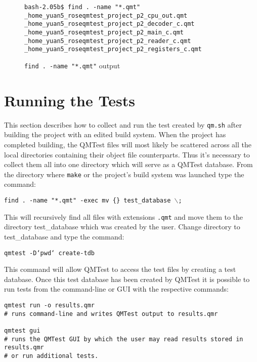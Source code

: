 \begin{figure}[!ht]
{\scriptsize
\begin{verbatim}
bash-2.05b$ find . -name "*.qmt" 
_home_yuan5_roseqmtest_project_p2_cpu_out.qmt
_home_yuan5_roseqmtest_project_p2_decoder_c.qmt
_home_yuan5_roseqmtest_project_p2_main_c.qmt
_home_yuan5_roseqmtest_project_p2_reader_c.qmt
_home_yuan5_roseqmtest_project_p2_registers_c.qmt
\end{verbatim}
}
\caption{{\tt find . -name "*.qmt"} output}
\end{figure}

\section{Running the Tests}

This section describes how to collect and run the test created by {\tt qm.sh}
after building the project with an edited build system. When the project has
completed building, the QMTest files will most likely be scattered across all
the local directories containing their object file counterparts. Thus it's
necessary to collect them all into one directory which will serve as a QMTest
database. From the directory where {\tt make} or the project's build system
was launched type the command:
\begin{center}
{\tt find . -name "*.qmt" -exec mv \{\} test\_database $\backslash$; }
\end{center}

This will recursively find all files with extensions {\tt .qmt} and move them
to the directory test\_database which was created by the user. Change directory
to test\_database and type the command:
\begin{center}
{\tt qmtest -D`pwd` create-tdb}
\end{center}
This command will allow QMTest to access the test files by creating a test
database. Once this test database has been created by QMTest it is possible to
run tests from the command-line or GUI with the respective commands:

\begin{verbatim}
qmtest run -o results.qmr 
# runs command-line and writes QMTest output to results.qmr 

qmtest gui 
# runs the QMTest GUI by which the user may read results stored in results.qmr 
# or run additional tests.
\end{verbatim}


